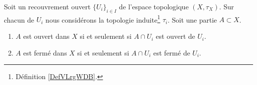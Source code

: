 \begin{lemma}	\label{LEMooTEZYooOvzGcl}
	Soit un recouvrement ouvert \( \{ U_i \}_{i\in I}\) de l'espace topologique \(  (X,\tau_X)  \). Sur chacun de \( U_i\) nous considérons la topologie induite\footnote{Définition \ref{DefVLrgWDB}.} \( \tau_i\).  Soit une partie \( A\subset X\).
	\begin{enumerate}
		\item  \label{ITEMooSVJRooTCEyog}
		      \( A\) est ouvert dans \( X\) si et seulement si \( A\cap U_i\) est ouvert de \( U_i\).
		\item		\label{ITEMooDXAIooSWqaPp}
		      \( A\) est fermé dans \( X\) si et seulement si \( A\cap U_i\) est fermé de \( U_i\).
	\end{enumerate}
\end{lemma}

